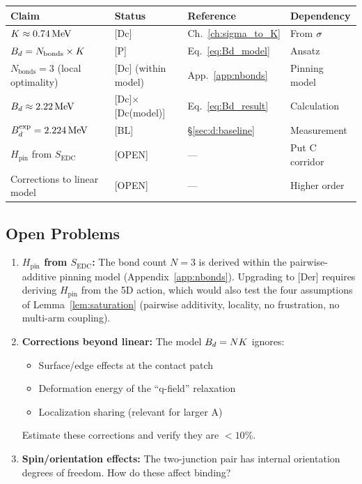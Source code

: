 \begin{center}
\begin{tabular}{llll}
\toprule
\textbf{Claim} & \textbf{Status} & \textbf{Reference} & \textbf{Dependency} \\
\midrule
$K \approx 0.74\,\mathrm{MeV}$ & [Dc] & Ch.~\ref{ch:sigma_to_K} & From $\sigma$ \\
$B_d = N_{\text{bonds}} \times K$ & [P] & Eq.~\eqref{eq:Bd_model} & Ansatz \\
$N_{\text{bonds}} = 3$ (local optimality) & [Dc] (within model) & App.~\ref{app:nbonds} & Pinning model \\
$B_d \approx 2.22\,\mathrm{MeV}$ & [Dc]$\times$[Dc(model)] & Eq.~\eqref{eq:Bd_result} & Calculation \\
\midrule
$B_d^{\text{exp}} = 2.224\,\mathrm{MeV}$ & [BL] & \S\ref{sec:d:baseline} & Measurement \\
\midrule
$H_{\text{pin}}$ from $S_{\text{EDC}}$ & [OPEN] & — & Put C corridor \\
Corrections to linear model & [OPEN] & — & Higher order \\
\bottomrule
\end{tabular}
\end{center}

\subsection{Open Problems}

\begin{edcopenbox}[title=Open Problems]
    \begin{enumerate}
        \item \textbf{$H_{\text{pin}}$ from $S_{\text{EDC}}$:} The bond
              count $N = 3$ is derived within the pairwise-additive pinning
              model (Appendix~\ref{app:nbonds}). Upgrading to [Der] requires
              deriving $H_{\text{pin}}$ from the 5D action, which would
              also test the four assumptions of Lemma~\ref{lem:saturation}
              (pairwise additivity, locality, no frustration, no multi-arm
              coupling).

        \item \textbf{Corrections beyond linear:} The model $B_d = NK$
              ignores:
              \begin{itemize}
                  \item Surface/edge effects at the contact patch
                  \item Deformation energy of the ``q-field'' relaxation
                  \item Localization sharing (relevant for larger A)
              \end{itemize}
              Estimate these corrections and verify they are $< 10\%$.

        \item \textbf{Spin/orientation effects:} The two-junction pair
              has internal orientation degrees of freedom. How do these
              affect binding?
    \end{enumerate}
    \tagOpen
\end{edcopenbox}

